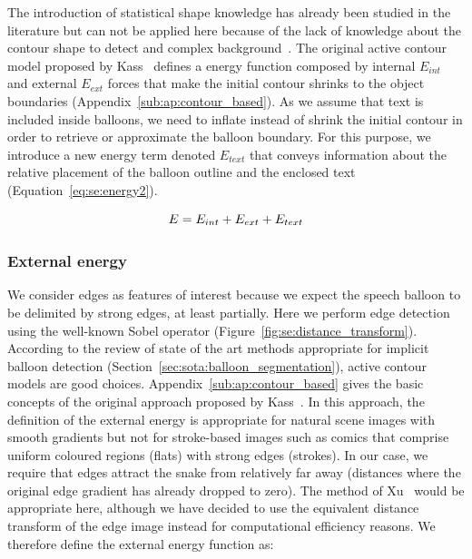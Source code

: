 The introduction of statistical shape knowledge has already been studied in the literature but can not be applied here because of the lack of knowledge about the contour shape to detect and complex background~\cite{Cremers2002}.
The original active contour model proposed by Kass~\cite{Kass1988} defines a energy function composed by internal $E_{int}$ and external $E_{ext}$ forces that make the initial contour shrinks to the object boundaries (Appendix~\ref{sub:ap:contour_based}).
As we assume that text is included inside balloons, we need to inflate instead of shrink the initial contour in order to retrieve or approximate the balloon boundary.
For this purpose, we introduce a new energy term denoted $E_{text}$ that conveys information about the relative placement of the balloon outline and the enclosed text (Equation~\ref{eq:se:energy2}).

\begin{equation}\label{eq:se:energy2}
  E = E_{int} + E_{ext} + E_{text}\\
\end{equation}

\subsubsection{External energy}
\label{sec:se:external_energie}

We consider edges as features of interest because we expect the speech balloon to be delimited by strong edges, at least partially.
Here we perform edge detection using the well-known Sobel operator (Figure~\ref{fig:se:distance_transform}).
According to the review of state of the art methods appropriate for implicit balloon detection (Section~\ref{sec:sota:balloon_segmentation}), active contour models are good choices.
Appendix~\ref{sub:ap:contour_based} gives the basic concepts of the original approach proposed by Kass~\cite{Kass1988}.
In this approach, the definition of the external energy is appropriate for natural scene images with smooth gradients but not for stroke-based images such as comics that comprise uniform coloured regions (flats) with strong edges (strokes).
In our case, we require that edges attract the snake from relatively far away (distances where the original edge gradient has already dropped to zero).
The method of Xu~\cite{Xu1998} would be appropriate here, although we have decided to use the equivalent distance transform of the edge image instead for computational efficiency reasons.
We therefore define the external energy function as:

